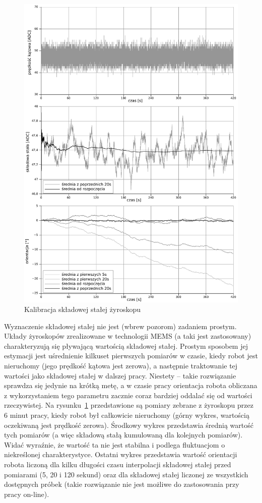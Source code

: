 \begin{figure}[htp!]
\centering
\includegraphics[width=15.5cm]{../../Common/pomiary/gyro_bias_bw}
\caption{Kalibracja składowej stałej żyroskopu}
\label{fig:gyro_bias}
\end{figure}

Wyznaczenie składowej stałej nie jest (wbrew pozorom) zadaniem prostym. Układy
żyroskopów zrealizowane w technologii MEMS (a taki jest zastosowany)
charakteryzują się pływającą wartością składowej stałej. Prostym sposobem jej
estymacji jest uśrednienie kilkuset pierwszych pomiarów w czasie, kiedy
robot jest nieruchomy (jego prędkość kątowa jest zerowa), a następnie
traktowanie tej wartości jako składowej stałej w dalszej pracy. Niestety --
takie rozwiązanie sprawdza się jedynie na krótką metę, a w czasie pracy
orientacja robota obliczana z wykorzystaniem tego parametru zacznie coraz
bardziej oddalać się od wartości rzeczywistej. Na rysunku~\ref{fig:gyro_bias}
przedstawione są pomiary zebrane z żyroskopu przez 6 minut pracy, kiedy robot
był całkowicie nieruchomy (górny wykres, wartością oczekiwaną jest prędkość
zerowa). Środkowy wykres przedstawia średnią wartość tych pomiarów (a więc
składową stałą kumulowaną dla kolejnych pomiarów). Widać wyraźnie, że wartość ta
nie jest stabilna i podlega fluktuacjom o niekreślonej charakterystyce. Ostatni
wykres przedstawia wartość orientacji robota liczoną dla kilku długości czasu
interpolacji składowej stałej przed pomiarami (5, 20 i 120 sekund) oraz dla
składowej stałej liczonej ze wszystkich dostępnych próbek (takie rozwiązanie
nie jest możliwe do zastosowania przy pracy on-line).

